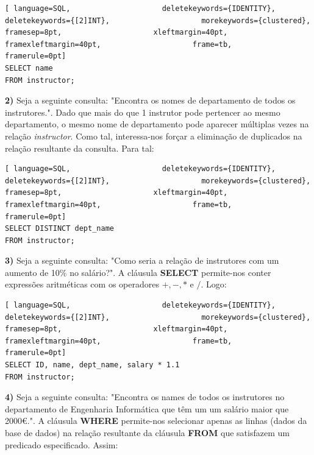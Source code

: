 \documentclass[oneside]{book}
\theoremstyle{definition}
\begin{document}
\begin{lstlisting}[ language=SQL,                     deletekeywords={IDENTITY},                     deletekeywords={[2]INT},                     morekeywords={clustered},                     framesep=8pt,                     xleftmargin=40pt,                     framexleftmargin=40pt,                     frame=tb,                     framerule=0pt]
SELECT name
FROM instructor;
\end{lstlisting} 
\textbf{2)} Seja a seguinte consulta: "Encontra os nomes de departamento de todos os instrutores.". Dado que mais do que 1 instrutor pode pertencer ao mesmo departamento, o mesmo nome de departamento pode aparecer múltiplas vezes na relação \textit{instructor}. Como tal, interessa-nos forçar a eliminação de duplicados na relação resultante da consulta. Para tal:

\begin{lstlisting}[ language=SQL,                     deletekeywords={IDENTITY},                     deletekeywords={[2]INT},                     morekeywords={clustered},                     framesep=8pt,                     xleftmargin=40pt,                     framexleftmargin=40pt,                     frame=tb,                     framerule=0pt]
SELECT DISTINCT dept_name
FROM instructor;
\end{lstlisting}
\textbf{3)} Seja a seguinte consulta: "Como seria a relação de instrutores com um aumento de 10\% no salário?". A cláusula \textbf{SELECT} permite-nos conter expressões aritméticas com os operadores $+, -, *$ e $/$. Logo:

\begin{lstlisting}[ language=SQL,                     deletekeywords={IDENTITY},                     deletekeywords={[2]INT},                     morekeywords={clustered},                     framesep=8pt,                     xleftmargin=40pt,                     framexleftmargin=40pt,                     frame=tb,                     framerule=0pt]
SELECT ID, name, dept_name, salary * 1.1
FROM instructor;
\end{lstlisting}
\textbf{4)} Seja a seguinte consulta: "Encontra os names de todos os instrutores no departamento de Engenharia Informática que têm um um salário maior que 2000€.". A cláusula \textbf{WHERE} permite-nos selecionar apenas as linhas (dados da base de dados) na relação resultante da cláusula \textbf{FROM} que satisfazem um predicado especificado. Assim:
\end{document}
